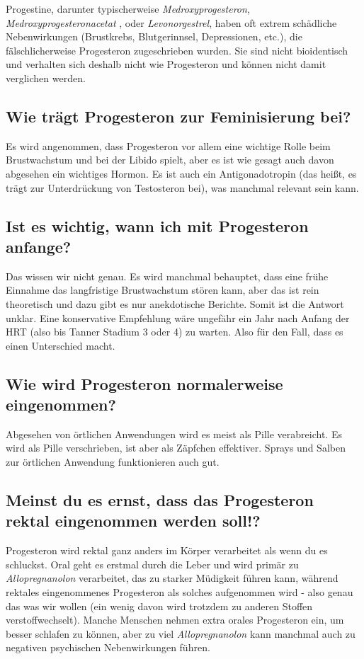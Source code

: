 \documentclass{article}
\begin{document}
Progestine, darunter typischerweise \textit{Medroxyprogesteron}, \textit{Medroxyprogesteronacetat }, oder \textit{Levonorgestrel}, haben oft extrem schädliche Nebenwirkungen (Brustkrebs, Blutgerinnsel, Depressionen, etc.), die fälschlicherweise Progesteron zugeschrieben wurden. Sie sind nicht bioidentisch und verhalten sich deshalb nicht wie Progesteron und können nicht damit verglichen werden.

\subsection{Wie trägt Progesteron zur Feminisierung bei?}

Es wird angenommen, dass Progesteron vor allem eine wichtige Rolle beim Brustwachstum und bei der Libido spielt, aber es ist wie gesagt auch davon abgesehen ein wichtiges Hormon. Es ist auch ein Antigonadotropin (das heißt, es trägt zur Unterdrückung von Testosteron bei), was manchmal relevant sein kann.

\subsection{Ist es wichtig, wann ich mit Progesteron anfange?}

Das wissen wir nicht genau. Es wird manchmal behauptet, dass eine frühe Einnahme das langfristige Brustwachstum stören kann, aber das ist rein theoretisch und dazu gibt es nur anekdotische Berichte. Somit ist die Antwort unklar. Eine konservative Empfehlung wäre ungefähr ein Jahr nach Anfang der HRT (also bis Tanner Stadium 3 oder 4) zu warten. Also für den Fall, dass es einen Unterschied macht.

\subsection{Wie wird Progesteron normalerweise eingenommen?}

Abgesehen von örtlichen Anwendungen wird es meist als Pille verabreicht. Es wird als Pille verschrieben, ist aber als Zäpfchen effektiver. Sprays und Salben zur örtlichen Anwendung funktionieren auch gut.

\subsection{Meinst du es ernst, dass das Progesteron rektal eingenommen werden soll!?}

Progesteron wird rektal ganz anders im Körper verarbeitet als wenn du es schluckst. Oral geht es erstmal durch die Leber und wird primär zu \textit{Allopregnanolon} verarbeitet, das zu starker Müdigkeit führen kann, während rektales eingenommenes Progesteron als solches aufgenommen wird - also genau das was wir wollen (ein wenig davon wird trotzdem zu anderen Stoffen verstoffwechselt). Manche Menschen nehmen extra orales Progesteron ein, um besser schlafen zu können, aber zu viel \textit{Allopregnanolon }kann manchmal auch zu negativen psychischen Nebenwirkungen führen.
\end{document}
